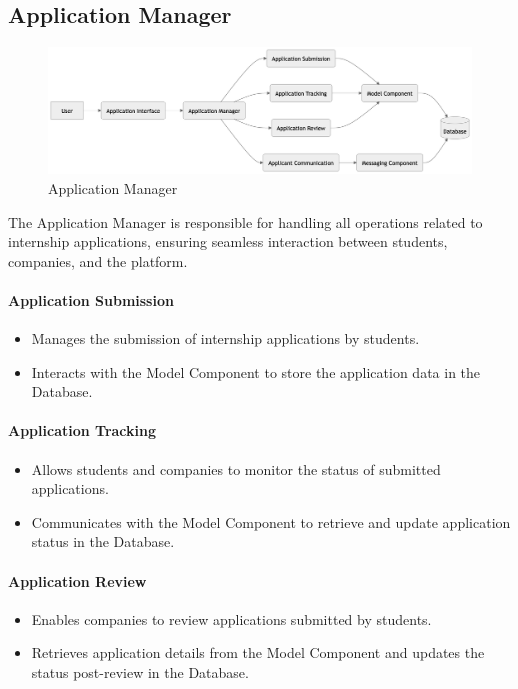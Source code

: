 \subsection{Application Manager}
\label{subsec:application_manager}
\begin{figure}[H]
    \begin{center}
        \includegraphics[width=0.82\linewidth]{JhaBhatiaSharma/imagesDD/ApplicationManager.png}
        \caption{Application Manager}
        \label{fig:applicationmanager}%
    \end{center}
\end{figure}

The Application Manager is responsible for handling all operations related to internship applications, ensuring seamless interaction between students, companies, and the platform.

\paragraph{Application Submission}
\begin{itemize}
    \item Manages the submission of internship applications by students.
    \item Interacts with the Model Component to store the application data in the Database.
\end{itemize}

\paragraph{Application Tracking}
\begin{itemize}
    \item Allows students and companies to monitor the status of submitted applications.
    \item Communicates with the Model Component to retrieve and update application status in the Database.
\end{itemize}

\paragraph{Application Review}
\begin{itemize}
    \item Enables companies to review applications submitted by students.
    \item Retrieves application details from the Model Component and updates the status post-review in the Database.
\end{itemize}

